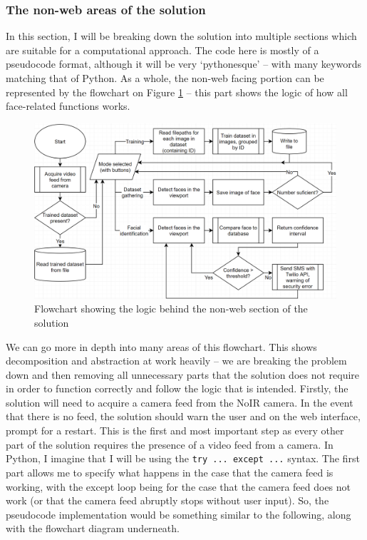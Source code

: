 \documentclass[9pt]{article}
\begin{document}
\subsubsection{The non-web areas of the solution}\label{sec_nonWeb}
In this section, I will be breaking down the solution into multiple sections which are suitable for a computational approach. The code here is mostly of a pseudocode format, although it will be very `pythonesque’ – with many keywords matching that of Python.
As a whole, the non-web facing portion can be represented by the flowchart on Figure \ref{fig_flowOverview} – this part shows the logic of how all face-related functions works.
\begin{figure}[H]
	\centering
	\includegraphics[width=6.2in]{flowOverview.png}
	\caption{Flowchart showing the logic behind the non-web section of the solution}\label{fig_flowOverview}
\end{figure}
We can go more in depth into many areas of this flowchart. This shows decomposition and abstraction at work heavily – we are breaking the problem down and then removing all unnecessary parts that the solution does not require in order to function correctly and follow the logic that is intended. 
Firstly, the solution will need to acquire a camera feed from the NoIR camera. In the event that there is no feed, the solution should warn the user and on the web interface, prompt for a restart. This is the first and most important step as every other part of the solution requires the presence of a video feed from a camera. In Python, I imagine that I will be using the \texttt{try ... except ...} syntax. The first part allows me to specify what happens in the case that the camera feed is working, with the except loop being for the case that the camera feed does not work (or that the camera feed abruptly stops without user input).
So, the pseudocode implementation would be something similar to the following, along with the flowchart diagram underneath.
\end{document}

